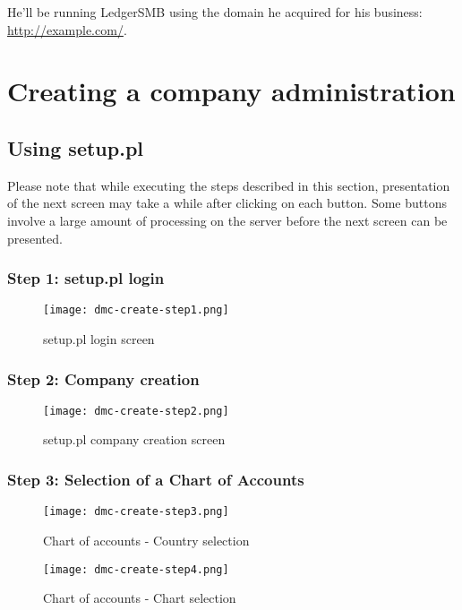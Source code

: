 He'll be running LedgerSMB using the domain he acquired for his business:
\url{http://example.com/}.

\chapter{Creating a company administration}
\label{cha:CompanyCreation}

\section{Using setup.pl}


Please note that while executing the steps described in this section, presentation of
the next screen may take a while after clicking on each button. Some buttons involve
a large amount of processing on the server before the next screen can be presented.

\subsection{Step 1: setup.pl login}

\begin{figure}[h]
\texttt{[image: dmc-create-step1.png]}
\caption{setup.pl login screen}
\end{figure}
\label{fig:setup-step1}

\subsection{Step 2: Company creation}

\begin{figure}[h]
\texttt{[image: dmc-create-step2.png]}
\caption{setup.pl company creation screen}
\end{figure}
\label{fig:setup-step2}


\subsection{Step 3: Selection of a Chart of Accounts}

\begin{figure}[h]
\texttt{[image: dmc-create-step3.png]}
\caption{Chart of accounts - Country selection}
\end{figure}
\label{fig:setup-step3}

\begin{figure}[h]
\texttt{[image: dmc-create-step4.png]}
\caption{Chart of accounts - Chart selection}
\end{figure}
\label{fig:setup-step4}


